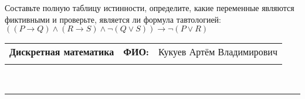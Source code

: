 \documentclass[10pt]{exam}
\newcommand{\class}{Дискретная математика}
\newcommand{\examdate}{}
\begin{document}
\begin{questions}
\begin{enumerate}[a)]
\end{enumerate}\question Составьте полную таблицу истинности, определите, какие переменные являются фиктивными и проверьте, является ли формула тавтологией:
$((P \rightarrow Q) \land (R \rightarrow S) \land \neg (Q \lor S)) \rightarrow \neg (P \lor R)$

\end{questions}
\newpage
\begin{flushright}
\begin{tabular}{p{2.8in} r l}
\textbf{\class} & \textbf{ФИО:} &Кукуев Артём Владимирович
\\

\textbf{\examdate} &&\\
\end{tabular}\\
\end{flushright}
\rule[1ex]{\textwidth}{.1pt}
\end{document}
